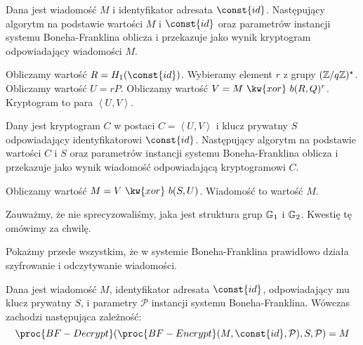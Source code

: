 \begin{algorithm}
Dana jest wiadomość $M$ i identyfikator adresata $\const{id}$.
Następujący algorytm na podstawie wartości $M$ i $\const{id}$
oraz parametrów instancji systemu Boneha-Franklina
oblicza i przekazuje jako wynik
kryptogram odpowiadający wiadomości $M$.

\begin{codebox}
\li
Obliczamy wartość $R = H_1(\const{id})$.
\li
Wybieramy element $r$ z grupy $(\mathbb{Z} / q\mathbb{Z})^\star$.
\li
Obliczamy wartość $U = rP$.
\li
Obliczamy wartość $V = M\ \kw{xor}\ b(R, Q)^r$.
\li
Kryptogram to para
$\left\langle U, V \right\rangle$.
\end{codebox}
\end{algorithm}

\begin{algorithm}
Dany jest kryptogram $C$ w postaci $C = \left\langle U, V \right\rangle$
i klucz prywatny $S$ odpowiadający identyfikatorowi $\const{id}$.
Następujący algorytm
na podstawie wartości $C$ i $S$
oraz parametrów instancji systemu Boneha-Franklina
oblicza i przekazuje jako wynik
wiadomość odpowiadającą kryptogramowi $C$.

\begin{codebox}
\li
Obliczamy wartość $M = V\ \kw{xor}\ b(S, U)$.
\li
Wiadomość to wartość $M$.
\end{codebox}
\end{algorithm}

\begin{remark}
Zauważmy, że nie sprecyzowaliśmy, jaka jest struktura grup $\mathbb{G}_1$ i $\mathbb{G}_2$.
Kwestię tę omówimy za chwilę.
\end{remark}

\noindent
Pokażmy przede wszystkim, że w systemie Boneha-Franklina
prawidłowo działa szyfrowanie i odczytywanie wiadomości.

\begin{theorem}
Dana jest wiadomość $M$,
identyfikator adresata $\const{id}$,
odpowiadający mu klucz prywatny $S$,
i parametry $\mathcal{P}$ instancji systemu Boneha-Franklina.
Wówczas zachodzi następująca zależność:
\begin{equation*}
\proc{BF-Decrypt}(
    \proc{BF-Encrypt}(
        M,
        \const{id},
        \mathcal{P}
    ),
    S,
    \mathcal{P}
) = M
\end{equation*}
\end{theorem}

